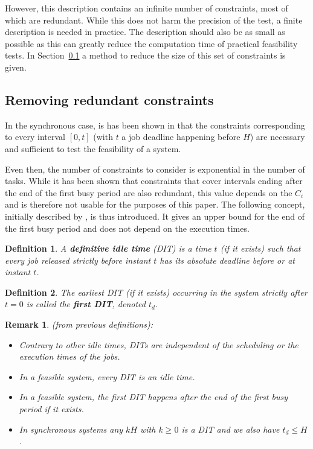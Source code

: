 \documentclass[conference]{IEEEtran}
\newtheorem{definition}{Definition}
\newtheorem{remark}{Remark}
\begin{document}
      However, this description contains an infinite number of constraints, most of
      which are redundant. While this does not harm the precision of the
      test, a finite description is needed in practice. The description should also be as small as possible as this can greatly
      reduce the computation time of practical feasibility tests. In Section~\ref{sct:removeRedundancy} a method to reduce the size of this set of constraints is given.

  \subsection{Removing redundant constraints}
    \label{sct:removeRedundancy}

  In the synchronous case, is has been shown in \cite{baruah1990algorithms} that the constraints corresponding
  to every interval $[0, t]$ (with $t$ a job deadline happening before $H$) are
  necessary and sufficient to test the feasibility of a system.

  Even then, the number of constraints to consider is exponential in the number
  of tasks. While it has been shown that constraints that cover intervals ending
  after the end of the first busy period are also redundant, this value depends on the $C_i$ and is
  therefore not usable for the purposes of this paper. The
  following concept, initially described by \cite{lipariaverage}, is thus introduced. It gives an upper bound for the end of the first busy period and does not depend on the execution times.

  \begin{definition}
    A \textbf{definitive idle time} (DIT) \cite{lipariaverage} is a time $t$ (if it exists) such that every job
    released strictly before instant $t$ has its absolute deadline before or at instant $t$.
  \end{definition}

  \begin{definition}
    The earliest DIT (if it exists) occurring in the system strictly after $t=0$ is called the
    \textbf{first DIT}, denoted $t_d$.
  \end{definition}

		\begin{remark} (from previous definitions):
			\begin{itemize}
				\item Contrary to other idle times, DITs are independent of the
					scheduling or the execution times of the jobs.
				\item In a feasible system, every DIT is an idle time.
				\item In a feasible system, the first DIT happens after the end of the
					first busy period if it exists.
				\item In synchronous systems any $kH$ with $k \geqslant 0$ is a DIT and we
					also have $t_d \leqslant H$.
			\end{itemize}
		\end{remark}
\end{document}
